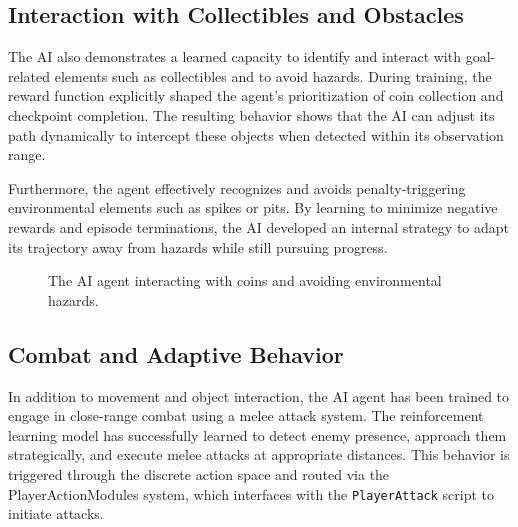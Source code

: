 \documentclass[12pt,oneside,openright,a4paper]{cpe-english-project}
\begin{document}
\subsection{Interaction with Collectibles and Obstacles}

The AI also demonstrates a learned capacity to identify and interact with goal-related elements such as collectibles and to avoid hazards. During training, the reward function explicitly shaped the agent's prioritization of coin collection and checkpoint completion. The resulting behavior shows that the AI can adjust its path dynamically to intercept these objects when detected within its observation range.

Furthermore, the agent effectively recognizes and avoids penalty-triggering environmental elements such as spikes or pits. By learning to minimize negative rewards and episode terminations, the AI developed an internal strategy to adapt its trajectory away from hazards while still pursuing progress.

\begin{figure}[H]
\centering
{}
\caption{The AI agent interacting with coins and avoiding environmental hazards.}
\label{fig:AIInt}
\end{figure}

\subsection{Combat and Adaptive Behavior}

In addition to movement and object interaction, the AI agent has been trained to engage in close-range combat using a melee attack system. The reinforcement learning model has successfully learned to detect enemy presence, approach them strategically, and execute melee attacks at appropriate distances. This behavior is triggered through the discrete action space and routed via the PlayerActionModules system, which interfaces with the \texttt{PlayerAttack} script to initiate attacks.
\end{document}
